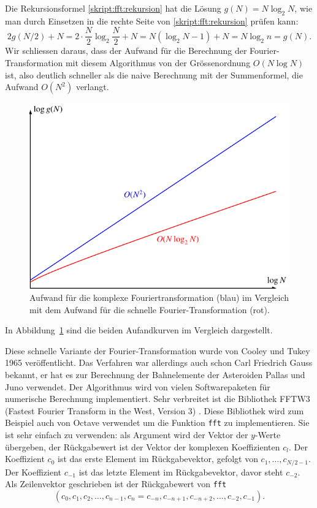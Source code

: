 Die Rekursionsformel
\eqref{skript:fft:rekursion}
hat die Lösung $g(N) = N\log_2 N$, wie man durch Einsetzen in die
rechte Seite von
\eqref{skript:fft:rekursion}
prüfen kann:
\[
2g(N/2) + N
=
2\cdot\frac{N}2\log_2\frac{N}2 + N
=
N(\log_2 N - 1) + N
=
N\log_2 n
=
g(N).
\]
Wir schliessen daraus, dass der Aufwand für die Berechnung der
Fourier-Transformation mit diesem Algorithmus von der Grössenordnung
$O(N\log N)$ ist, also deutlich schneller als die naive Berechnung
mit der Summenformel, die Aufwand $O(N^2)$ verlangt.
\begin{figure}
\centering
\includegraphics{chapters/6/fftaufwand.pdf}
\caption{Aufwand für die komplexe Fouriertransformation ({\color{blue}blau})
im Vergleich mit
dem Aufwand für die schnelle Fourier-Transformation ({\color{red}rot}).
\label{skript:fft:aufwandgraph}}
\end{figure}
In Abbildung~\ref{skript:fft:aufwandgraph} sind die beiden Aufandkurven im 
Vergleich dargestellt.

Diese schnelle Variante der Fourier-Transformation wurde von Cooley 
und Tukey 1965 veröffentlicht.
Das Verfahren war allerdings auch schon Carl Friedrich Gauss bekannt,
er hat es zur Berechnung der Bahnelemente der Asteroiden Pallas und
Juno verwendet.
Der Algorithmus wird von vielen Softwarepaketen für numerische Berechnung
implementiert.
Sehr verbreitet ist die Bibliothek FFTW3 (Fastest Fourier Transform in the
West, Version 3) \cite{skript:fftw}. 
Diese Bibliothek wird zum Beispiel auch von Octave verwendet um die
Funktion \texttt{fft} zu implementieren.
Sie ist sehr einfach zu verwenden: als Argument wird der Vektor der
$y$-Werte übergeben, der Rückgabewert ist der Vektor der komplexen
Koeffizienten $c_l$.
Der Koeffizient $c_0$ ist das erste Element im Rückgabevektor, gefolgt
von $c_1,\dots,c_{N/2-1}$.
Der Koeffizient $c_{-1}$ ist das letzte Element im Rückgabevektor, davor
steht $c_{-2}$.
Als Zeilenvektor geschrieben ist der Rückgabewert von \texttt{fft}
\[
( c_0, c_1, c_2, \dots , c_{n-1}, c_n=c_{-n},
c_{-n+1},c_{-n+2},\dots, c_{-2},c_{-1}).
\]


